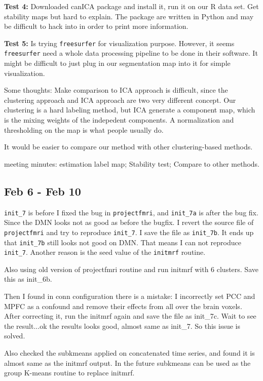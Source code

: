 \documentclass{article}
\begin{document}
\textbf{Test 4: } Downloaded canICA package and install it, run it on our R data set. Get stability maps but hard to explain. The package are written in Python and may be difficult to hack into in order to print more information.

\textbf{Test 5: } Is trying \texttt{freesurfer} for visualization purpose. However, it seems \texttt{freesurfer} need a whole data processing pipeline to be done in their software. It might be difficult to just plug in our segmentation map into it for simple visualization.

Some thoughts: Make comparison to ICA approach is difficult, since the clustering approach and ICA approach are two very different concept. Our clustering is a hard labeling method, but ICA generate a component map, which is the mixing weights of the indepedent components. A normalization and thresholding on the map is what people usually do.

It would be easier to compare our method with other clustering-based methods.

meeting minutes: estimation label map; Stability test; Compare to other methods.

\subsection{Feb 6 - Feb 10}
\texttt{init\_7} is before I fixed the bug in \texttt{projectfmri}, and \texttt{init\_7a} is after the bug fix. Since the DMN looks not as good as before the bugfix. I revert the source file of \texttt{projectfmri} and try to reproduce \texttt{init\_7}. I save the file as \texttt{init\_7b}. It ends up that \texttt{init\_7b} still looks not good on DMN. That means I can not reproduce \texttt{init\_7}. Another reason is the seed value of the \texttt{initmrf} routine.

Also using old version of projectfmri routine and run initmrf with 6 clusters. Save this as init\_6b.

Then I found in conn configuration there is a mistake: I incorrectly set PCC and MPFC as a confound and remove their effects from all over the brain voxels. After correcting it, run the initmrf again and save the file as init\_7c. Wait to see the result...ok the results looks good, almost same as init\_7. So this issue is solved.

Also checked the subkmeans applied on concatenated time series, and found it is almost same as the initmrf output. In the future subkmeans can be used as the group K-means routine to replace initmrf.
\end{document}
